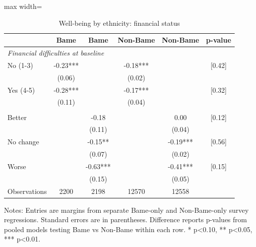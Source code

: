 \begin{table}[htbp]
\centering
\caption{Well-being by ethnicity: financial status}
\small
\begin{adjustbox}{max width=\textwidth}
\begin{tabular}{p{5.2cm}ccccc}
\toprule
& Bame & Bame & Non-Bame & Non-Bame & p-value \\
\midrule
\multicolumn{6}{l}{\textit{Financial difficulties at baseline}} \\
No (1-3) & -0.23*** &  & -0.18*** &  & [0.42] \\
& (0.06) &  & (0.02) &  & \\
Yes (4-5) & -0.28*** &  & -0.17*** &  & [0.32] \\
& (0.11) &  & (0.04) &  & \\
\addlinespace
\multicolumn{6}{l}{\textit{Change in financial status}} \\
Better &  & -0.18 &  & 0.00 & [0.12] \\
&  & (0.11) &  & (0.04) & \\
No change &  & -0.15** &  & -0.19*** & [0.56] \\
&  & (0.07) &  & (0.02) & \\
Worse &  & -0.63*** &  & -0.41*** & [0.15] \\
&  & (0.15) &  & (0.05) & \\
\midrule
Observations & 2200 & 2198 & 12570 & 12558 & \\
\bottomrule
\end{tabular}
\end{adjustbox}

\begin{flushleft}
\footnotesize Notes: Entries are margins from separate Bame-only and Non-Bame-only survey regressions. Standard errors are in parentheses. Difference reports p-values from pooled models testing Bame vs Non-Bame within each row. * p<0.10, ** p<0.05, *** p<0.01.
\end{flushleft}
\end{table}